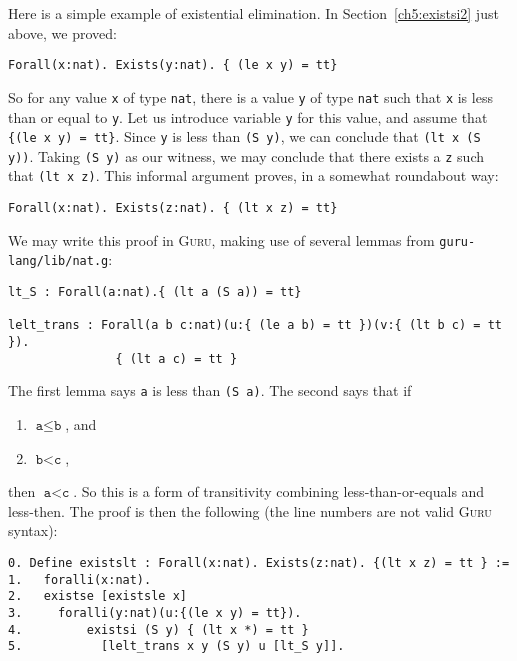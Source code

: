 \documentclass{book}[12pt]
\newcommand{\guru}[0]{\textsc{Guru}\xspace}
\begin{document}
Here is a simple example of existential elimination.  In
Section~\ref{ch5:existsi2} just above, we proved: 

\begin{verbatim}
Forall(x:nat). Exists(y:nat). { (le x y) = tt}
\end{verbatim}

\noindent So for any value \texttt{x} of type \texttt{nat}, there is a
value \texttt{y} of type \texttt{nat} such that \texttt{x} is less
than or equal to \texttt{y}.  Let us introduce variable \texttt{y} for
this value, and assume that \texttt{\{(le x y) = tt\}}.  Since
\texttt{y} is less than \texttt{(S y)}, we can conclude that
\texttt{(lt x (S y))}.  Taking \texttt{(S y)} as our witness, we may
conclude that there exists a \texttt{z} such that \texttt{(lt x z)}.
This informal argument proves, in a somewhat roundabout way:

\begin{verbatim}
Forall(x:nat). Exists(z:nat). { (lt x z) = tt}
\end{verbatim}

\noindent We may write this proof in \guru, making use of several lemmas
from \texttt{guru-lang/lib/nat.g}:

\begin{verbatim}
lt_S : Forall(a:nat).{ (lt a (S a)) = tt}

lelt_trans : Forall(a b c:nat)(u:{ (le a b) = tt })(v:{ (lt b c) = tt }).
               { (lt a c) = tt }
\end{verbatim}

\noindent The first lemma says \texttt{a} is less than \texttt{(S a)}.  The second says that if

\begin{enumerate}
\item $\texttt{a} \le \texttt{b}$, and
\item $\texttt{b} < \texttt{c}$,
\end{enumerate}

\noindent then $\texttt{a} < \texttt{c}$.  So this is a form of
transitivity combining less-than-or-equals and less-then.  The proof
is then the following (the line numbers are not valid \guru syntax):

\begin{verbatim}
0. Define existslt : Forall(x:nat). Exists(z:nat). {(lt x z) = tt } :=
1.   foralli(x:nat).
2.   existse [existsle x]
3.     foralli(y:nat)(u:{(le x y) = tt}).
4.         existsi (S y) { (lt x *) = tt }
5.           [lelt_trans x y (S y) u [lt_S y]].
\end{verbatim}
\end{document}
